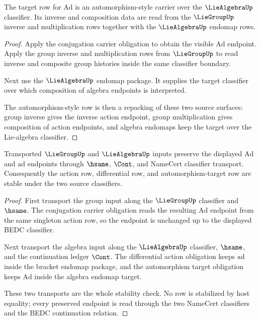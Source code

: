 \begin{theorem}
\label{thm:adjointrep-automorphism-target-obligation}
The target row for $\mathrm{Ad}$ is an automorphism-style carrier over the
$\LieAlgebraUp$ classifier. Its inverse and composition data are read from
the $\LieGroupUp$ inverse and multiplication rows together with the
$\LieAlgebraUp$ endomap rows.
\end{theorem}
\begin{proof}
Apply the conjugation carrier obligation to obtain the visible
$\mathrm{Ad}$ endpoint. Apply the group inverse and multiplication rows from
$\LieGroupUp$ to read inverse and composite group histories inside the same
classifier boundary.

Next use the $\LieAlgebraUp$ endomap package. It supplies the target
classifier over which composition of algebra endpoints is interpreted.

The automorphism-style row is then a repacking of these two source surfaces:
group inverse gives the inverse action endpoint, group multiplication gives
composition of action endpoints, and algebra endomaps keep the target over
the Lie-algebra classifier.
\end{proof}

\begin{theorem}
\label{thm:adjointrep-classifier-stability-obligation}
Transported $\LieGroupUp$ and $\LieAlgebraUp$ inputs preserve the displayed
$\mathrm{Ad}$ and $\mathrm{ad}$ endpoints through $\hsame$, $\Cont$, and
NameCert classifier transport. Consequently the action row, differential row,
and automorphism-target row are stable under the two source classifiers.
\end{theorem}
\begin{proof}
First transport the group input along the $\LieGroupUp$ classifier and
$\hsame$. The conjugation carrier obligation reads the resulting
$\mathrm{Ad}$ endpoint from the same singleton action row, so the endpoint is
unchanged up to the displayed BEDC classifier.

Next transport the algebra input along the $\LieAlgebraUp$ classifier,
$\hsame$, and the continuation ledger $\Cont$. The differential action
obligation keeps $\mathrm{ad}$ inside the bracket endomap package, and the
automorphism target obligation keeps $\mathrm{Ad}$ inside the algebra endomap
target.

These two transports are the whole stability check. No row is stabilized by
host equality; every preserved endpoint is read through the two NameCert
classifiers and the BEDC continuation relation.
\end{proof}

